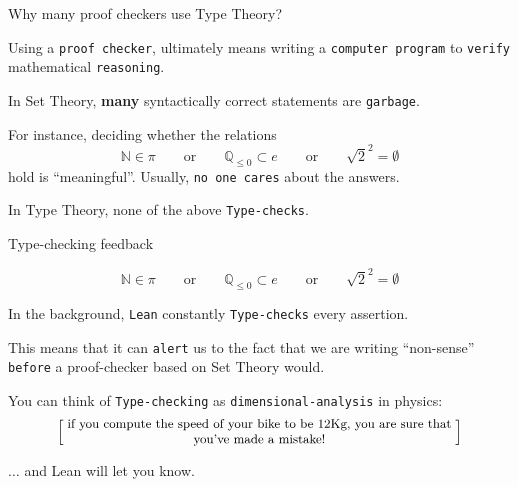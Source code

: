\documentclass{beamer}
\begin{document}
\begin{frame}[fragile]{Why many proof checkers use Type Theory?}

Using a {\color{violet}\verb`proof checker`}, ultimately means writing a {\color{violet}\verb`computer program`} to {\color{violet}\verb`verify`} mathematical {\color{violet}\verb`reasoning`}.

In Set Theory, {\textbf{many}} syntactically correct statements are {\color{violet}\verb`garbage`}.

For instance, deciding whether the relations
$$
  \mathbb{N} \in \pi
  \qquad {\textrm{or}} \qquad
  \mathbb{Q}_{\le 0} \subset e
  \qquad {\textrm{or}} \qquad
  \sqrt{2} ^ 2 = \emptyset
$$
hold is ``meaningful''.
Usually, {\color{violet}\verb`no one cares`} about the answers.

In Type Theory, none of the above {\color{violet}\verb`Type-checks`}.
\end{frame}

\begin{frame}[fragile]{Type-checking feedback}

$$
  \mathbb{N} \in \pi
  \qquad {\textrm{or}} \qquad
  \mathbb{Q}_{\le 0} \subset e
  \qquad {\textrm{or}} \qquad
  \sqrt{2} ^ 2 = \emptyset
$$

In the background, {\color{violet}\verb`Lean`} constantly {\color{violet}\verb`Type-checks`} every assertion.

This means that it can {\color{violet}\verb`alert`} us to the fact that we are writing ``non-sense'' {\color{violet}\verb`before`} a proof-checker based on Set Theory would.

You can think of {\color{violet}\verb`Type-checking`} as {\color{violet}\verb`dimensional-analysis`} in physics:
\[
  \left[ \;
  \parbox{0.8\textwidth}{\centering\small
  if you compute the speed of your bike to be $12$Kg, you are sure that you've made a mistake!
  }
  \; \right]
\]

$\ldots$ and Lean will let you know.
\end{frame}
\end{document}
